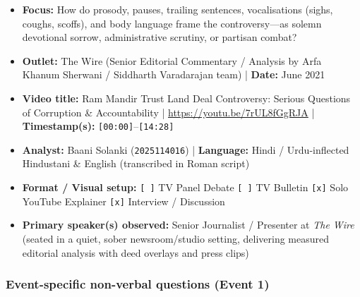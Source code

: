 \documentclass[10pt,a4paper]{article}
\begin{document}
\begin{itemize}
  \item \textbf{Focus:} How do prosody, pauses, trailing sentences, vocalisations (sighs, coughs, scoffs), and body language frame the controversy---as solemn devotional sorrow, administrative scrutiny, or partisan combat?
  \item \textbf{Outlet:} The Wire (Senior Editorial Commentary / Analysis by Arfa Khanum Sherwani / Siddharth Varadarajan team) | \textbf{Date:} June 2021
  \item \textbf{Video title:} Ram Mandir Trust Land Deal Controversy: Serious Questions of Corruption \& Accountability | \href{https://youtu.be/7rUL8fGgRJA}{https://youtu.be/7rUL8fGgRJA} | \textbf{Timestamp(s):} \texttt{[00:00]}--\texttt{[14:28]}
  \item \textbf{Analyst:} Baani Solanki (\texttt{2025114016}) | \textbf{Language:} Hindi / Urdu-inflected Hindustani \& English (transcribed in Roman script)
  \item \textbf{Format / Visual setup:} \texttt{[ ]} TV Panel Debate \texttt{[ ]} TV Bulletin \texttt{[x]} Solo YouTube Explainer \texttt{[x]} Interview / Discussion
  \item \textbf{Primary speaker(s) observed:} Senior Journalist / Presenter at \textit{The Wire} (seated in a quiet, sober newsroom/studio setting, delivering measured editorial analysis with deed overlays and press clips)
\end{itemize}

\subsubsection*{Event-specific non-verbal questions (Event 1)}
\end{document}
